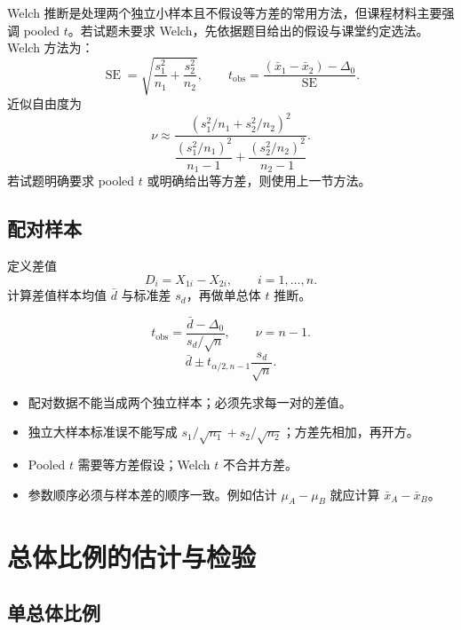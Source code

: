 \documentclass[11pt,a4paper]{article}
\newcommand{\SE}{\operatorname{SE}}
\newcommand{\1}{\mathbf{1}}
\begin{document}
Welch 推断是处理两个独立小样本且不假设等方差的常用方法，但课程材料主要强调 pooled $t$。若试题未要求 Welch，先依据题目给出的假设与课堂约定选法。Welch 方法为：
\[
  \SE
  =
  \sqrt{\frac{s_1^2}{n_1}+\frac{s_2^2}{n_2}},
\qquad
  t_{\mathrm{obs}}
  =
  \frac{(\bar x_1-\bar x_2)-\Delta_0}{\SE}.
\]
近似自由度为
\[
  \boxed{
  \nu
  \approx
  \frac{\left(s_1^2/n_1+s_2^2/n_2\right)^2}
  {\dfrac{(s_1^2/n_1)^2}{n_1-1}
  +
  \dfrac{(s_2^2/n_2)^2}{n_2-1}}.
  }
\]
若试题明确要求 pooled $t$ 或明确给出等方差，则使用上一节方法。

\subsection{配对样本}

定义差值
\[
  D_i=X_{1i}-X_{2i},
\qquad i=1,\ldots,n.
\]
计算差值样本均值 $\bar d$ 与标准差 $s_d$，再做单总体 $t$ 推断。

\begin{memorybox}[配对 $t$ 推断]
\[
  \boxed{
  t_{\mathrm{obs}}
  =
  \frac{\bar d-\Delta_0}{s_d/\sqrt n},
  \qquad \nu=n-1.
  }
\]
\[
  \boxed{
  \bar d\pm t_{\alpha/2,n-1}\frac{s_d}{\sqrt n}.
  }
\]
\end{memorybox}

\begin{warnbox}[两总体均值高频错误]
\begin{itemize}
  \item 配对数据不能当成两个独立样本；必须先求每一对的差值。
  \item 独立大样本标准误不能写成 $s_1/\sqrt{n_1}+s_2/\sqrt{n_2}$；方差先相加，再开方。
  \item Pooled $t$ 需要等方差假设；Welch $t$ 不合并方差。
  \item 参数顺序必须与样本差的顺序一致。例如估计 $\mu_A-\mu_B$ 就应计算 $\bar x_A-\bar x_B$。
\end{itemize}
\end{warnbox}

\section{总体比例的估计与检验}

\subsection{单总体比例}
\end{document}
